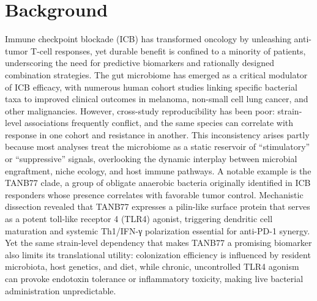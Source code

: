 \documentclass{article}
\begin{document}
\section{Background}

Immune checkpoint blockade (ICB) has transformed oncology by unleashing anti-tumor T-cell responses, yet durable benefit is confined to a minority of patients, underscoring the need for predictive biomarkers and rationally designed combination strategies. The gut microbiome has emerged as a critical modulator of ICB efficacy, with numerous human cohort studies linking specific bacterial taxa to improved clinical outcomes in melanoma, non-small cell lung cancer, and other malignancies. However, cross-study reproducibility has been poor: strain-level associations frequently conflict, and the same species can correlate with response in one cohort and resistance in another. This inconsistency arises partly because most analyses treat the microbiome as a static reservoir of “stimulatory” or “suppressive” signals, overlooking the dynamic interplay between microbial engraftment, niche ecology, and host immune pathways. A notable example is the TANB77 clade, a group of obligate anaerobic bacteria originally identified in ICB responders whose presence correlates with favorable tumor control. Mechanistic dissection revealed that TANB77 expresses a pilin-like surface protein that serves as a potent toll-like receptor 4 (TLR4) agonist, triggering dendritic cell maturation and systemic Th1/IFN-γ polarization essential for anti-PD-1 synergy. Yet the same strain-level dependency that makes TANB77 a promising biomarker also limits its translational utility: colonization efficiency is influenced by resident microbiota, host genetics, and diet, while chronic, uncontrolled TLR4 agonism can provoke endotoxin tolerance or inflammatory toxicity, making live bacterial administration unpredictable.
\end{document}
